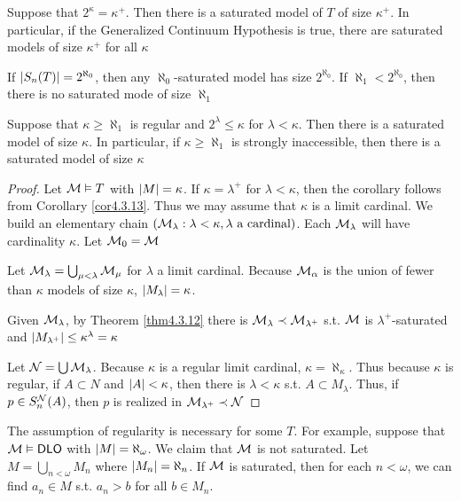 \documentclass[11pt]{article}
\begin{document}
\begin{corollary}[]
\label{cor4.3.13}
Suppose that \(2^\kappa=\kappa^+\). Then there is a saturated model of \(T\) of size \(\kappa^+\). In particular,
if the Generalized Continuum Hypothesis is true, there are saturated models of size \(\kappa^+\) for
all \(\kappa\)
\end{corollary}

If \(\abs{S_n(T)}=2^{\aleph_0}\), then any \(\aleph_0\)-saturated model has size \(2^{\aleph_0}\).
If \(\aleph_1<2^{\aleph_0}\), then there is no saturated mode of size \(\aleph_1\)

\begin{corollary}[]
Suppose that \(\kappa\ge\aleph_1\) is regular and \(2^\lambda\le\kappa\) for \(\lambda<\kappa\). Then there is a saturated model of
size \(\kappa\). In particular, if \(\kappa\ge\aleph_1\) is strongly inaccessible, then there is a saturated model of
size \(\kappa\)
\end{corollary}

\begin{proof}
Let \(\mathcal{M}\vDash T\) with \(\abs{M}=\kappa\). If \(\kappa=\lambda^+\) for \(\lambda<\kappa\), then the corollary follows from
Corollary \ref{cor4.3.13}. Thus we may assume that \(\kappa\) is a limit cardinal. We build an elementary
chain \((\mathcal{M}_\lambda:\lambda<\kappa,\lambda\text{ a cardinal})\). Each \(\mathcal{M}_\lambda\) will have cardinality \(\kappa\). Let \(\mathcal{M}_0=\mathcal{M}\)

Let \(\mathcal{M}_\lambda=\bigcup_{\mu<\lambda}\mathcal{M}_\mu\) for \(\lambda\) a limit cardinal. Because \(\mathcal{M}_\alpha\) is the union of fewer than \(\kappa\)
models of size \(\kappa\), \(\abs{M_\lambda}=\kappa\).

Given \(\mathcal{M}_\lambda\), by Theorem \ref{thm4.3.12} there is \(\mathcal{M}_\lambda\prec\mathcal{M}_{\lambda^+}\) s.t. \(\mathcal{M}\) is \(\lambda^+\)-saturated
and \(\abs{M_{\lambda^+}}\le\kappa^\lambda=\kappa\)

Let \(\mathcal{N}=\bigcup\mathcal{M}_\lambda\). Because \(\kappa\) is a regular limit cardinal, \(\kappa=\aleph_\kappa\). Thus because \(\kappa\) is regular,
if \(A\subset N\) and \(\abs{A}<\kappa\), then there is \(\lambda<\kappa\) s.t. \(A\subset M_\lambda\). Thus,
if \(p\in S_n^{\mathcal{N}}(A)\), then \(p\) is realized in \(\mathcal{M}_{\lambda^+}\prec\mathcal{N}\)
\end{proof}

The assumption of regularity is necessary for some \(T\). For example, suppose that \(\mathcal{M}\vDash\operatorname{\textsf{DLO}}\)
with \(\abs{M}=\aleph_\omega\). We claim that \(\mathcal{M}\) is not saturated. Let \(M=\bigcup_{n<\omega}M_n\)
where \(\abs{M_n}=\aleph_n\). If \(\mathcal{M}\) is saturated, then for each \(n<\omega\), we can find \(a_n\in M\)
s.t. \(a_n>b\) for all \(b\in M_n\).
\end{document}
